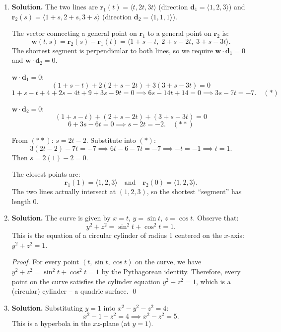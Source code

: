 \begin{enumerate}
\item \textbf{Solution.}
The two lines are \( \mathbf{r}_1(t) = \langle t, 2t, 3t \rangle \) (direction \( \mathbf{d}_1 = \langle 1, 2, 3 \rangle \)) and \( \mathbf{r}_2(s) = \langle 1 + s, 2 + s, 3 + s \rangle \) (direction \( \mathbf{d}_2 = \langle 1, 1, 1 \rangle \)).

The vector connecting a general point on \( \mathbf{r}_1 \) to a general point on \( \mathbf{r}_2 \) is:
\[
\mathbf{w}(t,s) = \mathbf{r}_2(s) - \mathbf{r}_1(t) = \langle 1 + s - t,\; 2 + s - 2t,\; 3 + s - 3t \rangle.
\]
The shortest segment is perpendicular to both lines, so we require \( \mathbf{w} \cdot \mathbf{d}_1 = 0 \) and \( \mathbf{w} \cdot \mathbf{d}_2 = 0 \).

\( \mathbf{w} \cdot \mathbf{d}_1 = 0 \):
\[
(1 + s - t) + 2(2 + s - 2t) + 3(3 + s - 3t) = 0
\]
\[
1 + s - t + 4 + 2s - 4t + 9 + 3s - 9t = 0 \implies 6s - 14t + 14 = 0 \implies 3s - 7t = -7. \quad (*)
\]

\( \mathbf{w} \cdot \mathbf{d}_2 = 0 \):
\[
(1 + s - t) + (2 + s - 2t) + (3 + s - 3t) = 0
\]
\[
6 + 3s - 6t = 0 \implies s - 2t = -2. \quad (**)
\]

From \( (**) \): \( s = 2t - 2 \). Substitute into \( (*) \):
\[
3(2t - 2) - 7t = -7 \implies 6t - 6 - 7t = -7 \implies -t = -1 \implies t = 1.
\]
Then \( s = 2(1) - 2 = 0 \).

The closest points are:
\[
\mathbf{r}_1(1) = \langle 1, 2, 3 \rangle \quad \text{and} \quad \mathbf{r}_2(0) = \langle 1, 2, 3 \rangle.
\]
The two lines actually intersect at \( (1, 2, 3) \), so the shortest ``segment'' has length \( 0 \).

\item \textbf{Solution.}
The curve is given by \( x = t \), \( y = \sin t \), \( z = \cos t \). Observe that:
\[
y^2 + z^2 = \sin^2 t + \cos^2 t = 1.
\]
This is the equation of a circular cylinder of radius 1 centered on the \( x \)-axis: \( y^2 + z^2 = 1 \).

\textit{Proof.} For every point \( (t, \sin t, \cos t) \) on the curve, we have \( y^2 + z^2 = \sin^2 t + \cos^2 t = 1 \) by the Pythagorean identity. Therefore, every point on the curve satisfies the cylinder equation \( y^2 + z^2 = 1 \), which is a (circular) cylinder -- a quadric surface. \qed

\item \textbf{Solution.}
Substituting \( y = 1 \) into \( x^2 - y^2 - z^2 = 4 \):
\[
x^2 - 1 - z^2 = 4 \implies x^2 - z^2 = 5.
\]
This is a hyperbola in the \( xz \)-plane (at \( y = 1 \)).


\end{enumerate}
